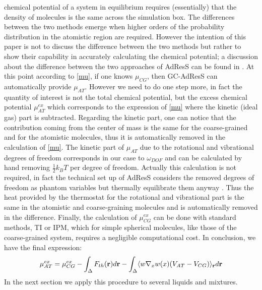 \documentclass[a4paper,preprint,unsortedaddress]{revtex4-1}
\begin{document}
chemical potential of a system in equilibrium requires (essentially) that the density of molecules is the same across the simulation box. The differences between the two methods emerge when higher orders of the probability distribution in the atomistic region are required. However the intention of this paper is not to discuss the difference between the two methods but rather to show their capability in accurately calculating the chemical potential; a discussion about the difference between the two approaches of AdResS can be found in \cite{luigientropy}. At this point according to \eqref{mu}, if one knows $\mu_{CG}$, then  GC-AdResS can automatically provide $\mu_{AT}$. However we need to do one step more, in fact the quantity of interest is not the total chemical potential, but the excess chemical potential $\mu^{ex}_{AT}$ which corresponds to the expression of \eqref{mu} where the kinetic (ideal gas) part is subtracted. Regarding the kinetic part, one can notice that the contribution coming from the center of mass is the same for the coarse-grained and for the atomistic molecules, thus it is automatically removed in the calculation of \eqref{mu}.
The kinetic part of $\mu_{AT}$ due to the rotational and vibrational degrees of freedom corresponds in our case to $\omega_{DOF}$ and can be calculated by hand removing $\frac{1}{2}k_{B}T$ per degree of freedom. Actually this calculation is not required, in fact the technical set up of AdResS considers the removed degrees of freedom as phantom variables but thermally equilibrate them anyway \cite{simon-ch}. Thus the heat provided by the thermostat for the rotational and vibrational part is the same in the atomistic and coarse-graining molecules and is automatically removed in the difference. Finally, the calculation of $\mu^{ex}_{CG}$ can be done with standard methods, TI or IPM, which for simple spherical molecules, like those of the coarse-grained system, requires a negligible computational cost.
In conclusion, we have the final expression:
\begin{equation}
\mu^{ex}_{AT}=\mu^{ex}_{CG}-\int_{\Delta}{F}_{th}({\bf r})d{\bf r}-\int_{\Delta}\langle w\nabla_{x} w(x) (V_{AT}-V_{CG})\rangle_{\bf r} d{\bf r}
\label{finalmu}
\end{equation}
In the next section we apply this procedure to several liquids and mixtures.
\end{document}
